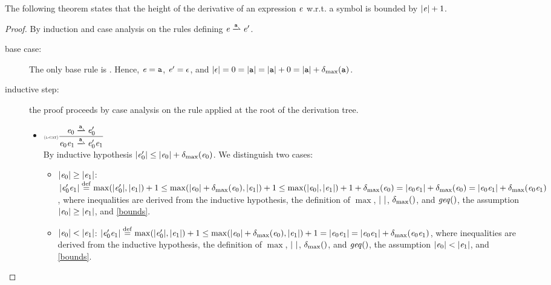 The following theorem states that the height of the derivative of an expression $\mathit {e}$ w.r.t. a symbol is bounded by ${\mid}{\mathit {e}}{\mid}+1$.
\begin{proof}
 By induction and case analysis on the rules defining $\re\parDer{\sym}\re'$.
 \begin{description}
  \item[base case:] The only base rule is .
   Hence, $\mathit {e}=\mathtt {a}$, $\mathit {e}'=\mathtt {\epsilon}$, and
   ${\mid}{\mathtt {\epsilon}}{\mid}=0={\mid}{\mathtt {a}}{\mid}={\mid}{\mathtt {a}}{\mid}+0={\mid}{\mathtt {a}}{\mid}+{\delta_{\max}}({\mathtt {a}})$.
  \item[inductive step:] the proof proceeds by case analysis on the rule applied
   at the root of the derivation tree.
   \begin{itemize}
    \item $\Rule{l-cat}{\re_0\parDer{\sym}\re'_0}{\re_0\catop\re_1\parDer{\sym}\re'_0\catop\re_1}{}$\\[2ex]
          By inductive hypothesis ${\mid}{\mathit {e}_0'}{\mid}\leq {\mid}{\ensuremath{\mathit {e}}_0}{\mid}+{\delta_{\max}}({\mathit {e}_0})$.
          We distinguish two cases:
          \begin{itemize}
           \item ${\mid}{\mathit {e}_0}{\mid}\geq{\mid}{\ensuremath{\mathit {e}}_1}{\mid}$:
                 ${\mid}{\mathit {e}_0'\mathit {e}_1}{\mid}\stackrel{\mathrm{def}}{=}\max({\mid}{\mathit {e}'_0}{\mid},{\mid}{\mathit {e}_1}{\mid})+1\leq\max({\mid}{\mathit {e}_0}{\mid}+{\delta_{\max}}({\mathit {e}_0}),{\mid}{\mathit {e}_1}{\mid})+1\leq\max({\mid}{\mathit {e}_0}{\mid},{\mid}{\mathit {e}_1}{\mid})+1+{\delta_{\max}}({\mathit {e}_0})={\mid}{\mathit {e}_0\mathit {e}_1}{\mid}+{\delta_{\max}}({\mathit {e}_0})={\mid}{\mathit {e}_0\mathit {e}_1}{\mid}+{\delta_{\max}}({\mathit {e}_0\mathit {e}_1})$, where inequalities are derived from the inductive hypothesis, the definition of $\max$, ${\mid}{\ }{\mid}$, ${\delta_{\max}}({})$, and $\mathit{geq}()$, the assumption ${\mid}{\mathit {e}_0}{\mid}\geq{\mid}{\ensuremath{\mathit {e}}_1}{\mid}$, and \cref{bounds}.

           \item ${\mid}{\mathit {e}_0}{\mid}<{\mid}{\mathit {e}_1}{\mid}$:
                 ${\mid}{\mathit {e}_0'\mathit {e}_1}{\mid}\stackrel{\mathrm{def}}{=}\max({\mid}{\mathit {e}'_0}{\mid},{\mid}{\mathit {e}_1}{\mid})+1\leq\max({\mid}{\mathit {e}_0}{\mid}+{\delta_{\max}}({\mathit {e}_0}),{\mid}{\mathit {e}_1}{\mid})+1={\mid}{\mathit {e}_0\mathit {e}_1}{\mid}={\mid}{\mathit {e}_0\mathit {e}_1}{\mid}+{\delta_{\max}}({\mathit {e}_0\mathit {e}_1})$, where inequalities are derived from the inductive hypothesis, the definition of $\max$, ${\mid}{\ }{\mid}$, ${\delta_{\max}}({})$, and $\mathit{geq}()$, the assumption ${\mid}{\mathit {e}_0}{\mid}<{\mid}{\mathit {e}_1}{\mid}$, and \cref{bounds}.
          \end{itemize}


\end{itemize}
\end{description}
\end{proof}
